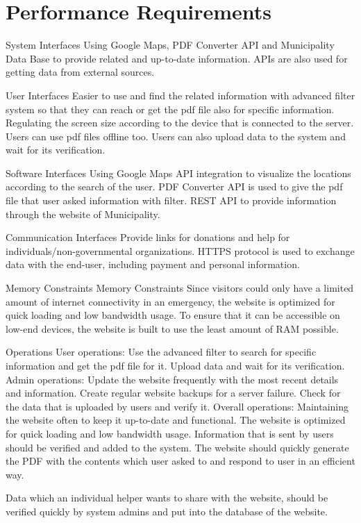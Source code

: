 \documentclass[12pt]{report}
\begin{document}
\section{Performance Requirements}System Interfaces
Using Google Maps, PDF Converter API and Municipality Data Base to provide related and up-to-date information. APIs are also used for getting data from external sources.

User Interfaces
Easier to use and find the related information with advanced filter system so that they can reach or get the pdf file also for specific information. Regulating the screen size according to the device that is connected to the server. Users can use pdf files offline too. Users can also upload data to the system and wait for its verification.

Software Interfaces
Using Google Maps API integration to visualize the locations according to the search of the user. PDF Converter API is used to give the pdf file that user asked information with filter. REST API to provide information through the website of Municipality.

Communication Interfaces
Provide links for donations and help for individuals/non-governmental organizations. HTTPS protocol is used to exchange data with the end-user, including payment and personal information.

Memory Constraints
Memory Constraints Since visitors could only have a limited amount of internet connectivity in an emergency, the website is optimized for quick loading and low bandwidth usage. To ensure that it can be accessible on low-end devices, the website is built to use the least amount of RAM possible.

Operations
User operations: Use the advanced filter to search for specific information and get the pdf file for it. Upload data and wait for its verification.
Admin operations: Update the website frequently with the most recent details and information. Create regular website backups for a server failure. Check for the data that is uploaded by users and verify it.
Overall operations: Maintaining the website often to keep it up-to-date and functional. The website is optimized for quick loading and low bandwidth usage. Information that is sent by users should be verified and added to the system.
The website should quickly generate the PDF with the contents which user asked to and respond to user in an efficient way.

Data which an individual helper wants to share with the website, should be verified quickly by system admins and put into the database of the website.
\end{document}
